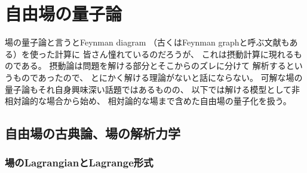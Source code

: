 \section{自由場の量子論}
\label{sec: QFT}

場の量子論と言うとFeynman diagram
（古くはFeynman graphと呼ぶ文献もある）を使った計算に
皆さん憧れているのだろうが、
これは摂動計算に現れるものである。
摂動論は問題を解ける部分とそこからのズレに分けて
解析するというものであったので、
とにかく解ける理論がないと話にならない。
可解な場の量子論もそれ自身興味深い話題ではあるものの、
以下では解ける模型として非相対論的な場合から始め、
相対論的な場まで含めた自由場の量子化を扱う。

\subsection{自由場の古典論、場の解析力学}

\subsubsection{場のLagrangianとLagrange形式}

